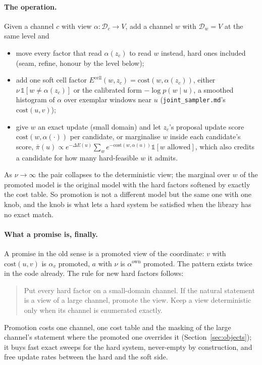 \documentclass[11pt]{article}
\newcommand{\1}{\mathds{1}}
\newcommand{\Dom}{\mathcal{D}}
\begin{document}
\paragraph{The operation.} Given a channel $c$ with view $\alpha : \Dom_c \to V$,
add a channel $w$ with $\Dom_w = V$ at the same level and
\begin{itemize}
  \item move every factor that read $\alpha(z_c)$ to read $w$ instead, hard ones
        included (seam, refine, honour by the level below);
  \item add one soft cell factor $E^{\mathrm{cell}}(w, z_c) = \mathrm{cost}(w, \alpha(z_c))$,
        either $\nu\,\1[w \ne \alpha(z_c)]$ or the calibrated form
        $-\log p(w \mid u)$, a smoothed histogram of $\alpha$ over exemplar windows
        near $u$ (\texttt{joint\_sampler.md}'s $\mathrm{cost}(u, v)$);
  \item give $w$ an exact update (small domain) and let $z_c$'s proposal update
        score $\mathrm{cost}(w, \alpha(\cdot))$ per candidate, or marginalise $w$ inside
        each candidate's score, $\bar\pi(u) \propto e^{-\Delta E(u)}\sum_w e^{-\mathrm{cost}(w, \alpha(u))}\1[w \text{ allowed}]$,
        which also credits a candidate for how many hard-feasible $w$ it admits.
\end{itemize}
As $\nu \to \infty$ the pair collapses to the deterministic view; the marginal
over $w$ of the promoted model is the original model with the hard factors
softened by exactly the cost table. So promotion is not a different model but
the same one with one knob, and the knob is what lets a hard system be
satisfied when the library has no exact match.

\paragraph{What a promise is, finally.} A promise in the old sense is a promoted
view of the coordinate: $v$ with $\mathrm{cost}(u, v)$ is $\alpha_v$ promoted, $a$
with $\nu$ is $\alpha^{\mathrm{own}}$ promoted. The pattern exists twice in the code
already. The rule for new hard factors follows:
\begin{quote}
  Put every hard factor on a small-domain channel. If the natural statement is a
  view of a large channel, promote the view. Keep a view deterministic only
  when its channel is enumerated exactly.
\end{quote}
Promotion costs one channel, one cost table and the masking of the large
channel's statement where the promoted one overrides it (Section~\ref{sec:objects});
it buys fast exact sweeps for the hard system, never-empty by construction,
and free update rates between the hard and the soft side.
\end{document}
